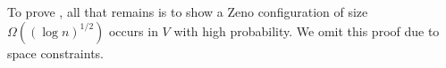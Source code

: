\documentclass{cccg12}
\begin{document}
To prove , all that remains is to show a Zeno
configuration of size $\Omega((\log n)^{1/2})$ occurs in $V$ with high
probability.  We omit this proof due to space constraints.

\end{document}
